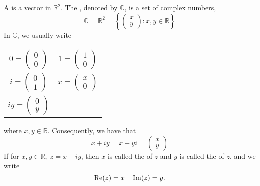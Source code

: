 \documentclass[notoc,notitlepage]{tufte-book}
\begin{document}
\begin{defn}\label{defn:Complex Number, Complex Plane}
	A  is a vector in $\mathbb{R}^2$. The , denoted by $\mathbb{C}$, is a set of complex numbers,
	\begin{equation*}
		\mathbb{C} = \mathbb{R}^2 = \left\{ \begin{pmatrix} x \\ y \end{pmatrix} : x , y \in \mathbb{R} \right\}
	\end{equation*}
	In $\mathbb{C}$, we usually write \\
	\begin{center}
		\begin{tabular}{c c}
			$0 = \begin{pmatrix} 0 \\ 0 \end{pmatrix}$ & $1 = \begin{pmatrix} 1 \\ 0 \end{pmatrix}$ \\
			$i = \begin{pmatrix} 0 \\ 1 \end{pmatrix}$ & $x = \begin{pmatrix} x \\ 0 \end{pmatrix}$ \\
			$iy = \begin{pmatrix} 0 \\ y \end{pmatrix}$
		\end{tabular}
	\end{center}
	where $x, y \in \mathbb{R}$. Consequently, we have that
	\begin{equation*}
		x + iy = x + yi = \begin{pmatrix} x \\ y \end{pmatrix}
	\end{equation*}
	If for $x, y \in \mathbb{R}, \; z = x + iy$, then $x$ is called the  of $z$ and $y$ is called the  of $z$, and we write
	\begin{equation*}
		\operatorname{Re}(z) = x \quad \operatorname{Im}(z) = y.
	\end{equation*}
\end{defn}
\end{document}
